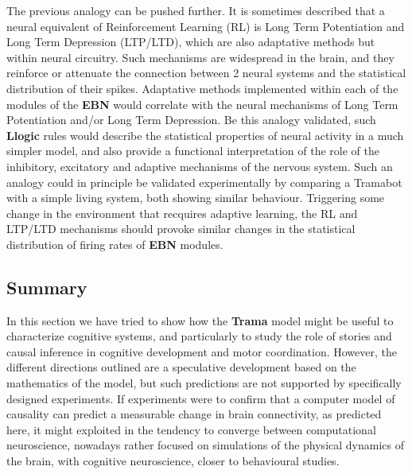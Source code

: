 \documentclass[
		twoside,openright,titlepage,numbers=noenddot,manychapters,
		headinclude,%
                footinclude=false,cleardoublepage=empty,
                BCOR=5mm,
		fontsize=11pt, %
                 enabledeprecatedfontcommands]{scrreprt}
\begin{document}
 The previous analogy can be pushed further.  It is sometimes described that a neural equivalent of Reinforcement Learning (RL) is Long Term Potentiation and Long Term Depression (LTP/LTD), which are also adaptative methods but within neural circuitry. Such mechanisms are widespread in the brain, and they reinforce or attenuate the connection between 2 neural systems and the statistical distribution of their spikes.
Adaptative methods implemented within each of the modules of the \textbf{EBN} would correlate with the neural mechanisms of Long Term Potentiation and/or Long Term Depression. Be this analogy validated, such \textbf{Llogic} rules would describe the statistical properties of neural activity in a much simpler model, and also provide a functional interpretation of the role of the inhibitory, excitatory and adaptive mechanisms of the nervous system.  Such an analogy could in principle be validated experimentally by comparing a Tramabot with a simple living system, both showing similar behaviour. Triggering some change in the environment that recquires adaptive learning, the RL and LTP/LTD mechanisms should provoke similar changes in the statistical distribution of firing rates of \textbf{EBN} modules. %




\subsection{Summary}
In this section we have tried to show how the \textbf{Trama} model might be useful to characterize cognitive systems, and particularly to study the role of stories and causal inference in cognitive development and motor coordination. However, the different directions outlined are a speculative development based on the mathematics of the model, but such predictions are not supported by specifically designed experiments. If experiments were to confirm that a computer model of causality can predict a measurable change in brain connectivity, as predicted here, it might exploited in the tendency to converge  between computational neuroscience, nowadays rather focused on simulations of the physical dynamics of the brain, with cognitive neuroscience, closer to behavioural studies. 
\end{document}
